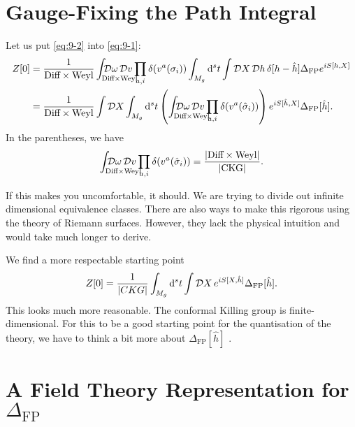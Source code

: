 \section{Gauge-Fixing the Path Integral}%
\label{sec:gauge_fixing_the_path_integral}

Let us put \eqref{eq:9-2} into \eqref{eq:9-1}:
\begin{align}
  Z[0] &= \frac{1}{\text{Diff} \times \text{Weyl}} \int_{\mathrlap{\text{Diff} \times \text{Weyl}}} \pdd{\omega} \pdd{v} \prod_{a, i} \delta(v^a(\sigma_i)) \int_{M_g} \dd[s]{t} \int \pdd{X} \pdd{h} \delta[h - \hat{h}] \Delta_{\text{FP}} e^{i S[h, X]} \\
       &= \frac{1}{\text{Diff} \times \text{Weyl}} \int \pdd{X} \int_{M_g} \dd[s]{t} \left( \int_{\mathrlap{\text{Diff} \times \text{Weyl}}} \pdd{\omega} \pdd{v} \prod_{a, i} \delta(v^a (\hat\sigma_i)) \right) e^{i S[\hat{h}, X]} \Delta_{\text{FP}}[\hat{h}].
\end{align}
In the parentheses, we have
\begin{equation}
  \int_{\mathrlap{\text{Diff} \times \text{Weyl}}}\pdd{\omega} \pdd{v} \prod_{a, i} \delta(v^a (\hat{\sigma}_i)) = \frac{\abs{\text{Diff} \times \text{Weyl}}}{\abs{\text{CKG}}}.
\end{equation}
\begin{leftbar}
  If this makes you uncomfortable, it should. We are trying to divide out infinite dimensional equivalence classes. There are also ways to make this rigorous using the theory of Riemann surfaces. However, they lack the physical intuition and would take much longer to derive.
\end{leftbar}
We find a more respectable starting point
\begin{equation}
  \label{eq:9-3}
  Z[0] = \frac{1}{\abs{CKG}} \int_{M_g} \dd[s]{t} \int \mathop{\mathcal{D} X} e^{i S[X, \hat{h}]} \Delta_{\text{FP}}[\hat{h}].
\end{equation}
This looks much more reasonable. The conformal Killing group is finite-dimensional. 
For this to be a good starting point for the quantisation of the theory, we have to think a bit more about $\Delta_{\text{FP}}[\hat{h}]$ .

\section{A Field Theory Representation for \texorpdfstring{$\Delta_{\text{FP}}$}{the Faddeev--Popov Determinant}}%
\label{sec:a_field_theory_representation_for_FP}

